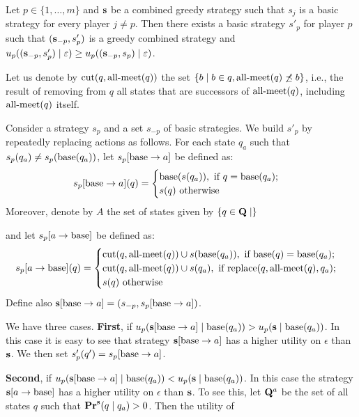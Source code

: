 \begin{mylem}
\label{lem-basic}
Let $p \in \{1, \ldots, m\}$ and $\mathbf{s}$ be a combined greedy strategy such that $s_j$ is a basic strategy for every player $j \neq p$. Then there exists a basic strategy $s'_p$ for player $p$ such that $(\mathbf{s}_{-p}, s'_p)$ is a greedy combined strategy and $u_p((\mathbf{s}_{-p},s'_p) \mid \varepsilon) \geq u_p((\mathbf{s}_{-p},s_p) \mid \varepsilon)$.
\end{mylem}

\newcommand{\succes}{\text{succ}}
\newcommand{\cut}{\text{cut}}
\newcommand{\replace}{\text{replace}}

Let us denote by $\cut(q,\ameet(q))$ the set $\{b \mid b \in q, \text{\rm all-meet}(q) \not \preceq b\}$, i.e., the result of 
removing from $q$ all states that are successors of $\text{\rm all-meet}(q)$, including $\text{\rm all-meet}(q)$ itself. 

Consider a strategy $s_p$ and a set $s_{-p}$ of basic strategies. We build $s'_p$ by repeatedly replacing actions as follows. 
For each state $q_a$ such that $s_p(q_a) \neq s_p(\text{\rm base}(q_a))$, let 
$s_p[\text{\rm base} \rightarrow a]$ be defined as: 
$$s_p[\text{\rm base} \rightarrow a](q) = \begin{cases}
\text{\rm base}(s(q_a)), \text{ if } q = \text{\rm base}(q_a); \\
s(q) \text{ otherwise }
\end{cases}
$$ 
Moreover, denote by $A$ the set of states given by 
$\{q \in \mathbf{Q} \mid \}$

and let $s_p[a \rightarrow \text{\rm base}]$ be defined as: 
$$s_p[a \rightarrow \base](q) = \begin{cases}
\cut(q,\ameet(q)) \cup s(\base(q_a)), \text{ if } \base(q) = \base(q_a); \\
\cut(q,\ameet(q)) \cup s(q_a), \text{ if } \replace(q,\ameet(q),q_a); \\
s(q) \text{ otherwise }
\end{cases}
$$ 
Define also $\mathbf{s}[\text{\rm base} \rightarrow a] = 
(s_{-p}, s_p[\text{\rm base} \rightarrow a])$. 




We have three cases. \textbf{First}, if $u_p(\mathbf{s}[\text{\rm base} \rightarrow a] \mid \text{\rm base}(q_a)) > u_p(\mathbf{s} \mid \text{\rm base}(q_a))$. In this case it is easy to see 
that strategy $\mathbf{s}[\text{\rm base} \rightarrow a]$ has a higher utility on $\epsilon$ than $\mathbf{s}$. We then set $s'_p(q') = s_p[\text{\rm base} \rightarrow a]$. 

\textbf{Second}, if $u_p(\mathbf{s}[\text{\rm base} \rightarrow a] \mid \text{\rm base}(q_a)) < u_p(\mathbf{s} \mid \text{\rm base}(q_a))$. In this case 
the strategy $\mathbf{s}[a \rightarrow \text{\rm base}]$ has a higher utility on $\epsilon$ than $\mathbf{s}$. To see this, let $\mathbf{Q}^a$ be the 
set of all states $q$ such that $\mathbf{Pr}^{\mathbf{s}}(q \mid q_a) > 0$. Then the utility of 

